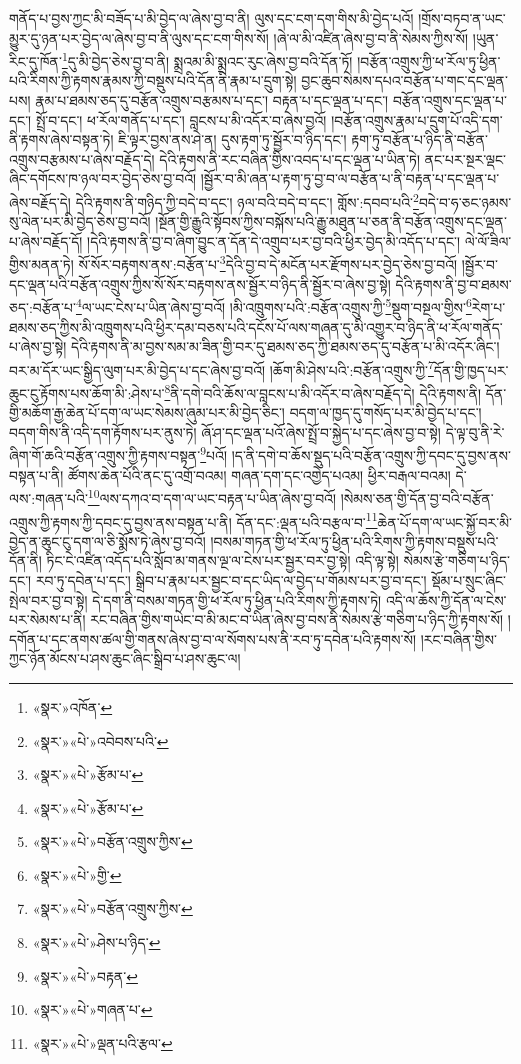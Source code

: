 གནོད་པ་བྱས་ཀྱང་མི་བཟོད་པ་མི་བྱེད་ལ་ཞེས་བྱ་བ་ནི། ལུས་དང་ངག་དག་གིས་མི་བྱེད་པའོ། །གྲོས་བཏབ་ན་ཡང་མྱུར་དུ་ཉན་པར་བྱེད་ལ་ཞེས་བྱ་བ་ནི་ལུས་དང་ངག་གིས་སོ། །ཞེ་ལ་མི་འཛིན་ཞེས་བྱ་བ་ནི་སེམས་ཀྱིས་སོ། །ཡུན་རིང་དུ་ཁོན་\footnote{«སྣར་»འཁོན་}དུ་མི་བྱེད་ཅེས་བྱ་བ་ནི། སྨྲའམ་མི་སྨྲའང་རུང་ཞེས་བྱ་བའི་དོན་ཏོ། །བརྩོན་འགྲུས་ཀྱི་ཕ་རོལ་ཏུ་ཕྱིན་པའི་རིགས་ཀྱི་རྟགས་རྣམས་ཀྱི་བསྡུས་པའི་དོན་ནི་རྣམ་པ་དྲུག་སྟེ། བྱང་ཆུབ་སེམས་དཔའ་བརྩོན་པ་གང་དང་ལྡན་པས། རྣམ་པ་ཐམས་ཅད་དུ་བརྩོན་འགྲུས་བརྩམས་པ་དང་། བརྟན་པ་དང་ལྡན་པ་དང་། བརྩོན་འགྲུས་དང་ལྡན་པ་དང་། སྤྲོ་བ་དང་། ཕ་རོལ་གནོད་པ་དང་། བླངས་པ་མི་འདོར་བ་ཞེས་བྱའོ། །བརྩོན་འགྲུས་རྣམ་པ་དྲུག་པོ་འདི་དག་ནི་རྟགས་ཞེས་བསྟན་ཏེ། ཇི་ལྟར་བྱས་ནས་ཤེ་ན། དུས་རྟག་ཏུ་སྦྱོར་བ་ཉིད་དང་། རྟག་ཏུ་བརྩོན་པ་ཉིད་ནི་བརྩོན་འགྲུས་བརྩམས་པ་ཞེས་བརྗོད་དེ། དེའི་རྟགས་ནི་རང་བཞིན་གྱིས་འབད་པ་དང་ལྡན་པ་ཡིན་ཏེ། ནང་པར་སྔར་ལྡང་ཞིང་དགོངས་ཁ་ཉལ་བར་བྱེད་ཅེས་བྱ་བའོ། །སྦྱོར་བ་མི་ཞན་པ་རྟག་ཏུ་བྱ་བ་ལ་བརྩོན་པ་ནི་བརྟན་པ་དང་ལྡན་པ་ཞེས་བརྗོད་དེ། དེའི་རྟགས་ནི་གཉིད་ཀྱི་བདེ་བ་དང་། ཉལ་བའི་བདེ་བ་དང་། གློས་:དབབ་པའི་\footnote{«སྣར་»«པེ་»འབེབས་པའི་}བདེ་བ་ཧ་ཅང་ཉམས་སུ་ལེན་པར་མི་བྱེད་ཅེས་བྱ་བའོ། །སྔོན་གྱི་རྒྱུའི་སྟོབས་ཀྱིས་བསྐོས་པའི་རྒྱུ་མཐུན་པ་ཅན་ནི་བརྩོན་འགྲུས་དང་ལྡན་པ་ཞེས་བརྗོད་དོ། །དེའི་རྟགས་ནི་བྱ་བ་ཞིག་བྱུང་ན་དོན་དེ་འགྲུབ་པར་བྱ་བའི་ཕྱིར་བྱེད་མི་འདོད་པ་དང་། ལེ་ལོ་ཟིལ་གྱིས་མནན་ཏེ། སོ་སོར་བརྟགས་ནས་:བརྩོན་པ་\footnote{«སྣར་»«པེ་»རྩོམ་པ་}དེའི་བྱ་བ་དེ་མངོན་པར་རྫོགས་པར་བྱེད་ཅེས་བྱ་བའོ། །སྦྱོར་བ་དང་ལྡན་པའི་བརྩོན་འགྲུས་ཀྱིས་སོ་སོར་བརྟགས་ནས་སྦྱོར་བ་ཉིད་ནི་སྦྱོར་བ་ཞེས་བྱ་སྟེ། དེའི་རྟགས་ནི་བྱ་བ་ཐམས་ཅད་:བརྩོན་པ་\footnote{«སྣར་»«པེ་»རྩོམ་པ་}ལ་ཡང་ངེས་པ་ཡིན་ཞེས་བྱ་བའོ། །མི་འཁྲུགས་པའི་:བརྩོན་འགྲུས་ཀྱི་\footnote{«སྣར་»«པེ་»བརྩོན་འགྲུས་ཀྱིས་}སྡུག་བསྔལ་གྱིས་\footnote{«སྣར་»«པེ་»གྱི་}རེག་པ་ཐམས་ཅད་ཀྱིས་མི་འཁྲུགས་པའི་ཕྱིར་དམ་བཅས་པའི་དངོས་པོ་ལས་གཞན་དུ་མི་འགྱུར་བ་ཉིད་ནི་ཕ་རོལ་གནོད་པ་ཞེས་བྱ་སྟེ། དེའི་རྟགས་ནི་མ་བྱས་སམ་མ་ཟིན་གྱི་བར་དུ་ཐམས་ཅད་ཀྱི་ཐམས་ཅད་དུ་བརྩོན་པ་མི་འདོར་ཞིང་། བར་མ་དོར་ཡང་སྒྱིད་ལུག་པར་མི་བྱེད་པ་དང་ཞེས་བྱ་བའོ། །ཆོག་མི་ཤེས་པའི་:བརྩོན་འགྲུས་ཀྱི་\footnote{«སྣར་»«པེ་»བརྩོན་འགྲུས་ཀྱིས་}དོན་གྱི་ཁྱད་པར་ཆུང་ངུ་རྟོགས་པས་ཆོག་མི་:ཤེས་པ་\footnote{«སྣར་»«པེ་»ཤེས་པ་ཉིད་}ནི་དགེ་བའི་ཆོས་ལ་བླངས་པ་མི་འདོར་བ་ཞེས་བརྗོད་དེ། དེའི་རྟགས་ནི། དོན་གྱི་མཆོག་རྒྱ་ཆེན་པོ་དག་ལ་ཡང་སེམས་ཞུམ་པར་མི་བྱེད་ཅིང་། བདག་ལ་ཁྱད་དུ་གསོད་པར་མི་བྱེད་པ་དང་། བདག་གིས་ནི་འདི་དག་རྟོགས་པར་ནུས་ཏེ། ཞོ་ཤ་དང་ལྡན་པའོ་ཞེས་སྤྲོ་བ་སྐྱེད་པ་དང་ཞེས་བྱ་བ་སྟེ། དེ་ལྟ་བུ་ནི་རེ་ཞིག་གོ་ཆའི་བརྩོན་འགྲུས་ཀྱི་རྟགས་བསྟན་\footnote{«སྣར་»«པེ་»བརྟན་}པའོ། །ད་ནི་དགེ་བ་ཆོས་སྡུད་པའི་བརྩོན་འགྲུས་ཀྱི་དབང་དུ་བྱས་ནས་བསྟན་པ་ནི། ཚོགས་ཆེན་པོའི་ནང་དུ་འགྲོ་བའམ། གཞན་དག་དང་འགྱེད་པའམ། ཕྱིར་བརྒལ་བའམ། དེ་ལས་:གཞན་པའི་\footnote{«སྣར་»«པེ་»གཞན་པ་}ལས་དཀའ་བ་དག་ལ་ཡང་བརྟན་པ་ཡིན་ཞེས་བྱ་བའོ། །སེམས་ཅན་གྱི་དོན་བྱ་བའི་བརྩོན་འགྲུས་ཀྱི་རྟགས་ཀྱི་དབང་དུ་བྱས་ནས་བསྟན་པ་ནི། དོན་དང་:ལྡན་པའི་བརྩལ་བ་\footnote{«སྣར་»«པེ་»ལྡན་པའི་རྩལ་}ཆེན་པོ་དག་ལ་ཡང་སྐྱོ་བར་མི་བྱེད་ན་ཆུང་ངུ་དག་ལ་ཅི་སྨོས་ཏེ་ཞེས་བྱ་བའོ། །བསམ་གཏན་གྱི་ཕ་རོལ་ཏུ་ཕྱིན་པའི་རིགས་ཀྱི་རྟགས་བསྡུས་པའི་དོན་ནི། ཏིང་ངེ་འཛིན་འདོད་པའི་སློབ་མ་གནས་ལྔ་ལ་ངེས་པར་སྦྱར་བར་བྱ་སྟེ། འདི་ལྟ་སྟེ། སེམས་རྩེ་གཅིག་པ་ཉིད་དང་། རབ་ཏུ་དབེན་པ་དང་། སྒྲིབ་པ་རྣམ་པར་སྦྱང་བ་དང་ཡིད་ལ་བྱེད་པ་གོམས་པར་བྱ་བ་དང་། སྡོམ་པ་སྲུང་ཞིང་སྤེལ་བར་བྱ་བ་སྟེ། དེ་དག་ནི་བསམ་གཏན་གྱི་ཕ་རོལ་ཏུ་ཕྱིན་པའི་རིགས་ཀྱི་རྟགས་ཏེ། འདི་ལ་ཆོས་ཀྱི་དོན་ལ་ངེས་པར་སེམས་པ་ནི། རང་བཞིན་གྱིས་གཡེང་བ་མི་མང་བ་ཡིན་ཞེས་བྱ་བས་ནི་སེམས་རྩེ་གཅིག་པ་ཉིད་ཀྱི་རྟགས་སོ། །དགོན་པ་དང་ནགས་ཚལ་གྱི་གནས་ཞེས་བྱ་བ་ལ་སོགས་པས་ནི་རབ་ཏུ་དབེན་པའི་རྟགས་སོ། །རང་བཞིན་གྱིས་ཀྱང་ཉོན་མོངས་པ་ཤས་ཆུང་ཞིང་སྒྲིབ་པ་ཤས་ཆུང་ལ། 